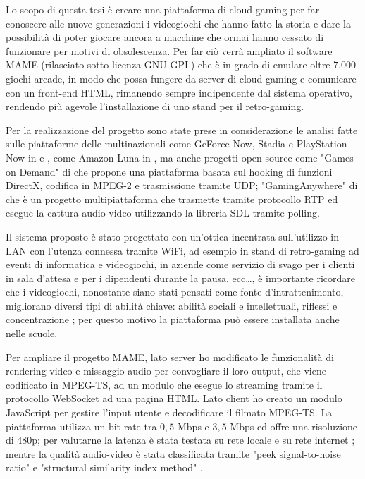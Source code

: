 Lo scopo di questa tesi è creare una piattaforma di cloud gaming per far conoscere alle nuove generazioni i videogiochi che hanno fatto la storia e dare la possibilità di poter giocare ancora a macchine che ormai hanno cessato di funzionare per motivi di obsolescenza. Per far ciò verrà ampliato il software MAME (rilasciato sotto licenza GNU-GPL) che è in grado di emulare oltre $7.000$ giochi arcade, in modo che possa fungere da server di cloud gaming e comunicare con un front-end HTML, rimanendo sempre indipendente dal sistema operativo, rendendo più agevole l'installazione di uno stand per il retro-gaming. 

Per la realizzazione del progetto sono state prese in considerazione le analisi fatte sulle piattaforme delle multinazionali come GeForce Now, Stadia e PlayStation Now in \parencite{A_Network_Analysis_on_Cloud_Gaming_Stadia_GeForce_Now_and_PSNow} e \parencite{Network_Analysis_of_the_Sony_Remote_Play_System}, come Amazon Luna in \parencite{Amazon_Luna_WebRTC}, ma anche progetti open source come "Games on Demand" di \parencite{ARealTimeStreamingGamesonDemandSystem} che propone una piattaforma basata sul hooking di funzioni DirectX, codifica in MPEG-2 e trasmissione tramite UDP; "GamingAnywhere" di \parencite{GamingAnywhere} che è un progetto multipiattaforma che trasmette tramite protocollo RTP ed esegue la cattura audio-video utilizzando la libreria SDL tramite polling.

Il sistema proposto è stato progettato con un'ottica incentrata sull'utilizzo in LAN con l'utenza connessa tramite WiFi, ad esempio in stand di retro-gaming ad eventi di informatica e videogiochi, in aziende come servizio di svago per i clienti in sala d'attesa e per i dipendenti durante la pausa, ecc\dots, è importante ricordare che i videogiochi, nonostante siano stati pensati come fonte d'intrattenimento, migliorano diversi tipi di abilità chiave: abilità sociali e intellettuali, riflessi e concentrazione \parencite{Use_of_Cloud_Gaming_in_Education}; per questo motivo la piattaforma può essere installata anche nelle scuole.

Per ampliare il progetto MAME, lato server ho modificato le funzionalità di rendering video e missaggio audio per convogliare il loro output, che viene codificato in MPEG-TS, ad un modulo che esegue lo streaming tramite il protocollo WebSocket ad una pagina HTML. Lato client ho creato un modulo JavaScript per gestire l'input utente e decodificare il filmato MPEG-TS. La piattaforma utilizza un bit-rate tra $0,5$ Mbps e $3,5$ Mbps ed offre una risoluzione di 480p; per valutarne la latenza è stata testata su rete locale e su rete internet \parencite{Latency_analysis_for_M2M}; mentre la qualità audio-video è stata classificata tramite "peek signal-to-noise ratio" e "structural similarity index method" \parencite{Cloud_Gaming_Architecture_and_Performance}.



